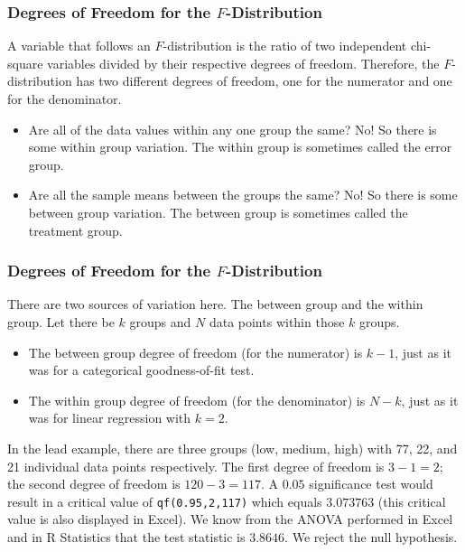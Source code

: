 \documentclass[xcolor=dvipsnames]{beamer}
\begin{document}
\begin{frame}
  \frametitle{Degrees of Freedom for the $F$-Distribution}
  A variable that follows an $F$-distribution is the ratio of two
  independent chi-square variables divided by their respective degrees
  of freedom. Therefore, the $F$-distribution has two different
  degrees of freedom, one for the numerator and one for the
  denominator.
  \begin{itemize}
  \item Are all of the data values within any one group the same? No!
    So there is some within group variation. The within group is
    sometimes called the error group.
  \item Are all the sample means between the groups the same? No! So
    there is some between group variation. The between group is
    sometimes called the treatment group.
  \end{itemize}
\end{frame}

\begin{frame}
  \frametitle{Degrees of Freedom for the $F$-Distribution}
  There are two sources of variation here. The between group and the
  within group. Let there be $k$ groups and $N$ data points within
  those $k$ groups.
  \begin{itemize}
  \item The between group degree of freedom (for the numerator) is
    $k-1$, just as it was for a categorical goodness-of-fit test.
  \item The within group degree of freedom (for the denominator) is
    $N-k$, just as it was for linear regression with $k=2$.
  \end{itemize}
  In the lead example, there are three groups (low, medium, high) with
  77, 22, and 21 individual data points respectively. The first degree
  of freedom is $3-1=2$; the second degree of freedom is $120-3=117$.
  A $0.05$ significance test would result in a critical value of
  \texttt{qf(0.95,2,117)} which equals $3.073763$ (this critical value
  is also displayed in Excel). We know from the ANOVA performed in
  Excel and in R Statistics that the test statistic is $3.8646$. We
  reject the null hypothesis.
\end{frame}
\end{document}
